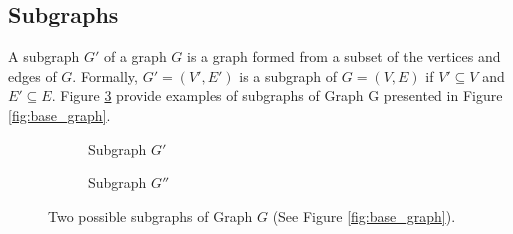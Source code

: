         \subsection{Subgraphs}
        
            A subgraph \( G' \) of a graph \( G \) is a graph formed from a subset of the vertices and edges of \( G \). Formally, \( G' = (V', E') \) is a subgraph of \( G = (V, E) \) if \( V' \subseteq V \) and \( E' \subseteq E \). Figure \ref{fig:subgraphs} provide examples of subgraphs of Graph G presented in Figure \ref{fig:base_graph}.

            \begin{figure}[!ht]
                \centering
                \begin{subfigure}{0.45\textwidth}
                    \centering
                    \caption{Subgraph $G'$} 
                    \label{fig:subgraph_1}
                \end{subfigure}
                \hfill
                \begin{subfigure}{0.45\textwidth}
                    \centering
                    \caption{Subgraph $G''$} 
                    \label{fig:subgraph_2}
                \end{subfigure}
                \caption{Two possible subgraphs of Graph $G$ (See Figure \ref{fig:base_graph}).}
                \label{fig:subgraphs}
            \end{figure}
        
